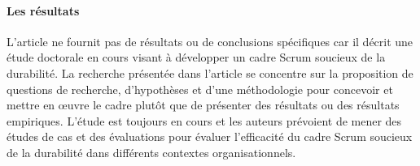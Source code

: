 \paragraph{Les résultats}
L'article ne fournit pas de résultats ou de conclusions spécifiques car il décrit une étude doctorale en cours visant à développer un cadre Scrum soucieux de la durabilité. La recherche présentée dans l'article se concentre sur la proposition de questions de recherche, d'hypothèses et d'une méthodologie pour concevoir et mettre en œuvre le cadre plutôt que de présenter des résultats ou des résultats empiriques. L'étude est toujours en cours et les auteurs prévoient de mener des études de cas et des évaluations pour évaluer l'efficacité du cadre Scrum soucieux de la durabilité dans différents contextes organisationnels.